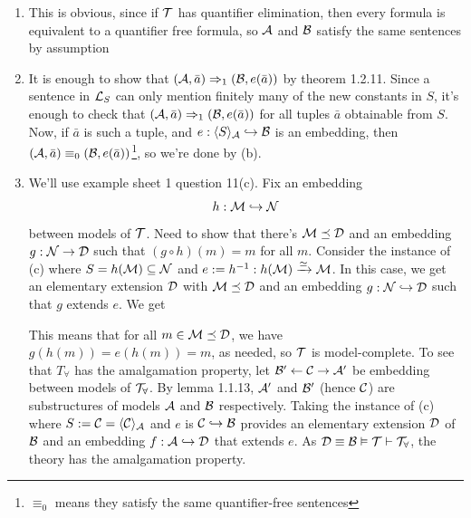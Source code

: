 \documentclass{article}
\numberwithin{thm}{subsection}
\begin{document}
 \proof \hspace{0.1cm} \begin{enumerate}
    \item[$(a) \Rightarrow (b)$:] This is obvious, since if $\mathcal{T}$ has quantifier elimination, then every formula is equivalent to a quantifier free formula, so $\mathcal{A}$ and $\mathcal{B}$ satisfy the same sentences by assumption
    \item[$(b) \Rightarrow (c)$:] It is enough to show that $(\mathcal{A}, \bar a) \Rightarrow_{1} (\mathcal{B}, e(\bar a))$ by theorem 1.2.11. Since a sentence in $\mathcal{L}_{S}$ can only mention finitely many of the new constants in $S$, it's enough to check that $(\mathcal{A}, \bar a) \Rightarrow_{1} (\mathcal{B}, e(\bar a))$ for all tuples $\bar a$ obtainable from $S$. Now, if $\bar a$ is such a tuple, and $e: \langle S \rangle_{\mathcal{A}} \hookrightarrow \mathcal{B}$ is an embedding, then $(\mathcal{A}, \bar a) \equiv_{0} (\mathcal{B}, e(\bar a))$\footnote{$\equiv_{0}$ means they satisfy the same quantifier-free sentences}, so we're done by (b).
    \item[$(c) \Rightarrow (d)$:] We'll use example sheet 1 question 11(c). Fix an embedding \[ h : \mathcal{M} \hookrightarrow \mathcal{N}\] between models of $\mathcal{T}$. Need to show that there's $\mathcal{M} \preceq \mathcal{D}$ and an embedding $g: \mathcal{N} \to \mathcal{D}$ such that $(g \circ h)(m)=m$ for all $m$. Consider the instance of (c) where $S = h(\mathcal{M}) \subseteq \mathcal{N}$ and $e := h^{-1} : h(\mathcal{M}) \xrightarrow{\simeq} \mathcal{M}$. In this case, we get an elementary extension $\mathcal{D}$ with $\mathcal{M} \preceq \mathcal{D}$ and an embedding $g: \mathcal{N} \hookrightarrow \mathcal{D}$ such that $g$ extends $e$. We get \begin{center}
    \end{center}
    This means that for all $m \in \mathcal{M} \preceq \mathcal{D}$, we have $g(h(m))=e(h(m))=m$, as needed, so $\mathcal{T}$ is model-complete. \gap To see that $T_{\forall}$ has the amalgamation property, let $\mathcal{B}' \leftarrow \mathcal{C} \rightarrow \mathcal{A}'$ be embedding between models of $\mathcal{T}_{\forall}$. By lemma 1.1.13, $\mathcal{A}'$ and $\mathcal{B}'$ (hence $\mathcal{C}$) are substructures of models $\mathcal{A}$ and $\mathcal{B}$ respectively. Taking the instance of (c) where $S := \mathcal{C} = \langle \mathcal{C} \rangle_{\mathcal{A}}$ and $e$ is $\mathcal{C} \hookrightarrow \mathcal{B}$ provides an elementary extension $\mathcal{D}$ of $\mathcal{B}$ and an embedding $f: \mathcal{A} \hookrightarrow \mathcal{D}$ that extends $e$. As $\mathcal{D} \equiv \mathcal{B} \vDash \mathcal{T} \vdash \mathcal{T}_{\forall}$, the theory has the amalgamation property.

\end{enumerate}
\end{document}
